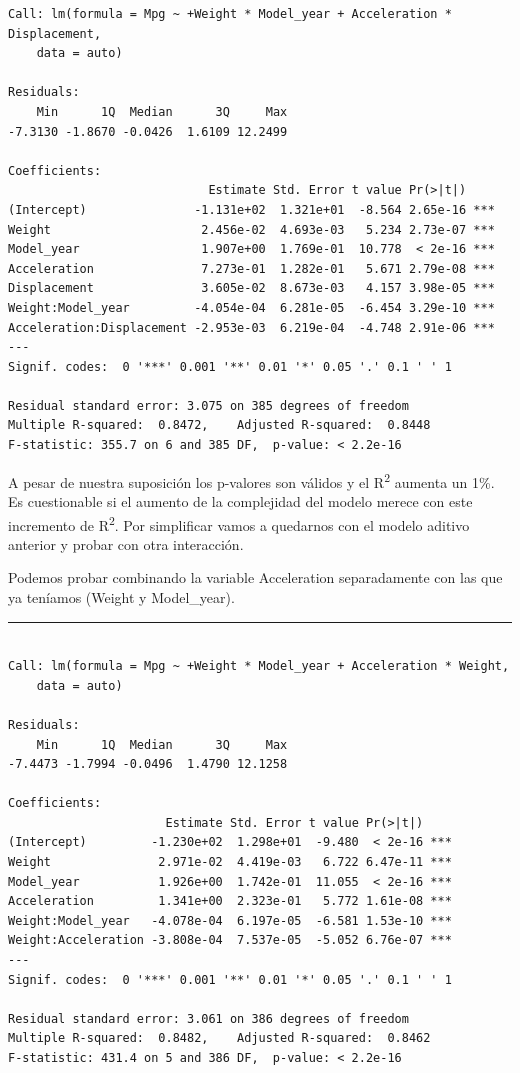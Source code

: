 \begin{verbatim}
Call: lm(formula = Mpg ~ +Weight * Model_year + Acceleration * Displacement, 
    data = auto)

Residuals:
    Min      1Q  Median      3Q     Max 
-7.3130 -1.8670 -0.0426  1.6109 12.2499 

Coefficients:
                            Estimate Std. Error t value Pr(>|t|)    
(Intercept)               -1.131e+02  1.321e+01  -8.564 2.65e-16 ***
Weight                     2.456e-02  4.693e-03   5.234 2.73e-07 ***
Model_year                 1.907e+00  1.769e-01  10.778  < 2e-16 ***
Acceleration               7.273e-01  1.282e-01   5.671 2.79e-08 ***
Displacement               3.605e-02  8.673e-03   4.157 3.98e-05 ***
Weight:Model_year         -4.054e-04  6.281e-05  -6.454 3.29e-10 ***
Acceleration:Displacement -2.953e-03  6.219e-04  -4.748 2.91e-06 ***
---
Signif. codes:  0 '***' 0.001 '**' 0.01 '*' 0.05 '.' 0.1 ' ' 1

Residual standard error: 3.075 on 385 degrees of freedom
Multiple R-squared:  0.8472,    Adjusted R-squared:  0.8448 
F-statistic: 355.7 on 6 and 385 DF,  p-value: < 2.2e-16
\end{verbatim}

A pesar de nuestra suposición los p-valores son válidos y el R\textsuperscript{2} aumenta un 1\%. Es cuestionable si el aumento de la complejidad del modelo merece con este incremento de R\textsuperscript{2}. Por simplificar vamos a quedarnos con el modelo aditivo anterior y probar con otra interacción.

\vspace{\baselineskip}

Podemos probar combinando la variable Acceleration separadamente con las que ya teníamos (Weight y Model\_year).

\begin{center}\rule{\linewidth}{0.5pt}\end{center}

\begin{verbatim}

Call: lm(formula = Mpg ~ +Weight * Model_year + Acceleration * Weight, 
    data = auto)

Residuals:
    Min      1Q  Median      3Q     Max 
-7.4473 -1.7994 -0.0496  1.4790 12.1258 

Coefficients:
                      Estimate Std. Error t value Pr(>|t|)    
(Intercept)         -1.230e+02  1.298e+01  -9.480  < 2e-16 ***
Weight               2.971e-02  4.419e-03   6.722 6.47e-11 ***
Model_year           1.926e+00  1.742e-01  11.055  < 2e-16 ***
Acceleration         1.341e+00  2.323e-01   5.772 1.61e-08 ***
Weight:Model_year   -4.078e-04  6.197e-05  -6.581 1.53e-10 ***
Weight:Acceleration -3.808e-04  7.537e-05  -5.052 6.76e-07 ***
---
Signif. codes:  0 '***' 0.001 '**' 0.01 '*' 0.05 '.' 0.1 ' ' 1

Residual standard error: 3.061 on 386 degrees of freedom
Multiple R-squared:  0.8482,    Adjusted R-squared:  0.8462 
F-statistic: 431.4 on 5 and 386 DF,  p-value: < 2.2e-16
\end{verbatim}

